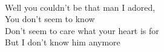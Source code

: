 \\
Well you couldn't be that man I adored, \\
You don't seem to know \\
Don't seem to care what your heart is for \\
But I don't know him anymore \\
\\
